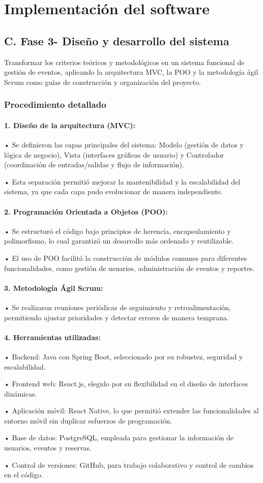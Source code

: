 \section{Implementación del software}
\subsection{C. Fase 3- Diseño y desarrollo del sistema}
Transformar los criterios teóricos y metodológicos en un sistema funcional de gestión de eventos, aplicando la arquitectura MVC, la POO y la metodología ágil Scrum como guías de construcción y organización del proyecto.

\subsubsection{Procedimiento detallado}
\paragraph{1. Diseño de la arquitectura (MVC):}
• Se definieron las capas principales del sistema: Modelo (gestión de datos y lógica de negocio), Vista (interfaces gráficas de usuario) y Controlador (coordinación de entradas/salidas y flujo de información).

• Esta separación permitió mejorar la mantenibilidad y la escalabilidad del sistema, ya que cada capa pudo evolucionar de manera independiente.

\paragraph{2. Programación Orientada a Objetos (POO):}
• Se estructuró el código bajo principios de herencia, encapsulamiento y polimorfismo, lo cual garantizó un desarrollo más ordenado y reutilizable.

• El uso de POO facilitó la construcción de módulos comunes para diferentes funcionalidades, como gestión de usuarios, administración de eventos y reportes.

\paragraph{3. Metodología Ágil Scrum:}
• Se realizaron reuniones periódicas de seguimiento y retroalimentación, permitiendo ajustar prioridades y detectar errores de manera temprana.

\paragraph{4. Herramientas utilizadas:}
• Backend: Java con Spring Boot, seleccionado por su robustez, seguridad y escalabilidad.

• Frontend web: React.js, elegido por su flexibilidad en el diseño de interfaces dinámicas.

• Aplicación móvil: React Native, lo que permitió extender las funcionalidades al entorno móvil sin duplicar esfuerzos de programación.

• Base de datos: PostgreSQL, empleada para gestionar la información de usuarios, eventos y reservas.

• Control de versiones: GitHub, para trabajo colaborativo y control de cambios en el código.